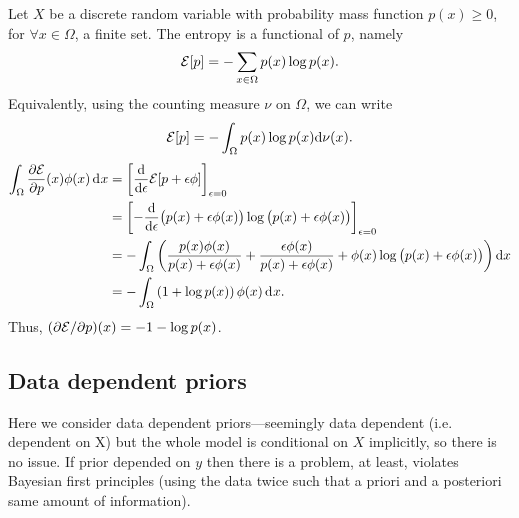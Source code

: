 \begin{example}
  Let $X$ be a discrete random variable with probability mass function $p(x) \geq 0$, for $\forall x \in \Omega$, a finite set.
  The entropy is a functional of $p$, namely
  \[
    {\mathcal E}[p] = - \sum_{x\in\Omega} p(x)\log p(x).
  \]
  Equivalently, using the counting measure $\nu$ on $\Omega$, we can write
  \[
    {\mathcal E}[p] = -\int_\Omega p(x) \log p(x) \text{d}\nu(x).
  \]
  \begin{align*}
    \int_\Omega \frac{\partial{\mathcal E}}{\partial p}(x)\phi(x) \operatorname{d}\hspace{0.5pt}\! x
    &= \left[ \frac{\text{d}}{\text{d} \epsilon} {\mathcal E}[p +  \epsilon\phi] \right]_{\epsilon=0} \\
    &= \left[ -\frac{\text{d}}{\text{d} \epsilon} 
    \big( p(x) + \epsilon\phi(x) \big) 
    \log \big(p(x) + \epsilon\phi(x) \big) 
    \right]_{\epsilon=0} \\
    &= -\int_\Omega \left( 
    \frac{p(x)\phi(x)}{p(x)+\epsilon\phi(x)}
    + \frac{\epsilon\phi(x)}{p(x) + \epsilon\phi(x)}
    + \phi(x)\log\big( p(x) + \epsilon\phi(x) \big)
    \right) \text{d} x \\
    &= -\int_\Omega \left( 1 + \log p(x) \right) \phi(x) \operatorname{d}\hspace{0.5pt}\! x.
  \end{align*}
  Thus, $(\partial{\mathcal E}/\partial p)(x) = -1 -\log p(x)$.
\end{example}

\subsection{Data dependent priors}

Here we consider data dependent priors---seemingly data dependent (i.e. dependent on X) but the whole model is conditional on $X$ implicitly, so there is no issue.
If prior depended on $y$ then there is a problem, at least, violates Bayesian first principles (using the data twice such that a priori and a posteriori same amount of information).

